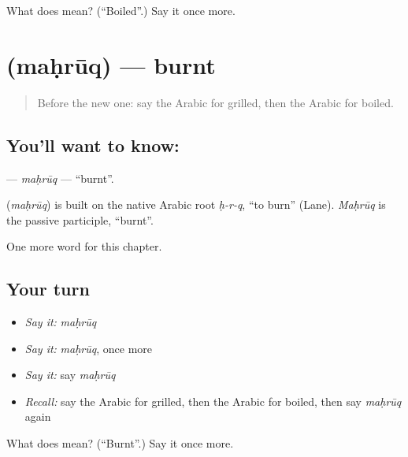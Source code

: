 \begin{tcolorbox}[breakable,colback=teal!4,colframe=teal!35!black,title={Before you move on}]
What does  mean? (\textquotedblleft{}Boiled\textquotedblright{}.) Say it once more.
\end{tcolorbox}
\section[\texorpdfstring{\ar{محروق} (maḥrūq)}{محروق (maḥrūq)}]{ (maḥrūq) — burnt}

\label{lesson:AR-C209-mahruq}



\begin{quote}
Before the new one: say the Arabic for grilled, then the Arabic for boiled.
\end{quote}

\subsection*{You'll want to know: }
\textbf{} — \emph{maḥrūq} — \textquotedblleft{}burnt\textquotedblright{}.

\begin{cousinweb}
\textbf{} (\emph{maḥrūq}) is built on the native Arabic root \emph{ḥ-r-q}, \textquotedblleft{}to burn\textquotedblright{} (Lane). \emph{Maḥrūq} is the passive participle, \textquotedblleft{}burnt\textquotedblright{}.
\end{cousinweb}

\begin{grammarlens}[title={What you've built}]
One more word for this chapter.
\end{grammarlens}

\subsection*{Your turn}
\begin{itemize}
\raggedright
  \item \emph{Say it:} \emph{maḥrūq}
  \item \emph{Say it:} \emph{maḥrūq}, once more
  \item \emph{Say it:} say \emph{maḥrūq}
  \item \emph{Recall:} say the Arabic for grilled, then the Arabic for boiled, then say \emph{maḥrūq} again
\end{itemize}

\begin{tcolorbox}[breakable,colback=teal!4,colframe=teal!35!black,title={Before you move on}]
What does  mean? (\textquotedblleft{}Burnt\textquotedblright{}.) Say it once more.
\end{tcolorbox}
